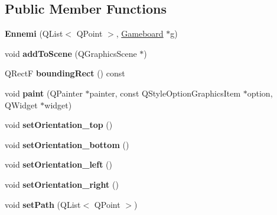 \subsection*{Public Member Functions}
\begin{DoxyCompactItemize}
\item 
\hypertarget{class_ennemi_af86e9134a1cfd8d878305924702b9d7a}{}{\bfseries Ennemi} (Q\+List$<$ Q\+Point $>$, \hyperlink{class_gameboard}{Gameboard} $\ast$g)\label{class_ennemi_af86e9134a1cfd8d878305924702b9d7a}

\item 
\hypertarget{class_ennemi_ae62d1dcf274319710e7ac4495c95a221}{}void {\bfseries add\+To\+Scene} (Q\+Graphics\+Scene $\ast$)\label{class_ennemi_ae62d1dcf274319710e7ac4495c95a221}

\item 
\hypertarget{class_ennemi_aa00ff90bbb5d71456a23673e77c41bb4}{}Q\+Rect\+F {\bfseries bounding\+Rect} () const \label{class_ennemi_aa00ff90bbb5d71456a23673e77c41bb4}

\item 
\hypertarget{class_ennemi_afbdea6c2e62c2065694a32db0f049325}{}void {\bfseries paint} (Q\+Painter $\ast$painter, const Q\+Style\+Option\+Graphics\+Item $\ast$option, Q\+Widget $\ast$widget)\label{class_ennemi_afbdea6c2e62c2065694a32db0f049325}

\item 
\hypertarget{class_ennemi_a7c509f048996eecb4ee768a044825d15}{}void {\bfseries set\+Orientation\+\_\+top} ()\label{class_ennemi_a7c509f048996eecb4ee768a044825d15}

\item 
\hypertarget{class_ennemi_ab3bbc6381307320c22b1686c5bc59d93}{}void {\bfseries set\+Orientation\+\_\+bottom} ()\label{class_ennemi_ab3bbc6381307320c22b1686c5bc59d93}

\item 
\hypertarget{class_ennemi_ac455b7c41a46dc42a27841b9c566e329}{}void {\bfseries set\+Orientation\+\_\+left} ()\label{class_ennemi_ac455b7c41a46dc42a27841b9c566e329}

\item 
\hypertarget{class_ennemi_a4e99225c7a632efceebba66996d7d9ee}{}void {\bfseries set\+Orientation\+\_\+right} ()\label{class_ennemi_a4e99225c7a632efceebba66996d7d9ee}

\item 
\hypertarget{class_ennemi_a482e9c5ccc0cf1c3aa4e83f32f3eedb1}{}void {\bfseries set\+Path} (Q\+List$<$ Q\+Point $>$)\label{class_ennemi_a482e9c5ccc0cf1c3aa4e83f32f3eedb1}

\end{DoxyCompactItemize}
